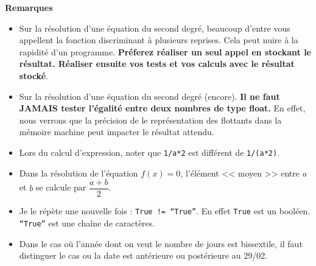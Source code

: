 \documentclass[10pt,fleqn]{article} %
\begin{document}
\textbf{Remarques}
\begin{itemize}
\item Sur la résolution d'une équation du second degré, beaucoup d'entre vous appellent la fonction discriminant à plusieurs reprises. Cela peut nuire à la rapidité d'un programme. \textbf{Préferez réaliser un seul appel en stockant le résultat. Réaliser ensuite vos tests et vos calculs avec le résultat stocké}.
\item Sur la résolution d'une équation du second degré (encore). \textbf{Il ne faut JAMAIS tester l'égalité entre deux nombres de type float.} En effet, nous verrons que la précision de le représentation des flottants dans la mémoire machine peut impacter le résultat attendu.
\item Lors du calcul d'expression, noter que \texttt{1/a*2} est différent de \texttt{1/(a*2)}.
\item Dans la résolution de l'équation $f(x)=0$, l'élément << moyen >> entre $a$ et $b$ se calcule par $\dfrac{a+b}{2}$.
\item Je le répète une nouvelle fois : \texttt{True != ``True''}. En effet \texttt{True} est un booléen. \texttt{``True''} est une chaîne de caractères. 
\item Dans le cas où l'année dont on veut le nombre de jours est bissextile, il faut distinguer le cas ou la date est antérieure ou postérieure au 29/02.
\end{itemize}






%
\end{document}

